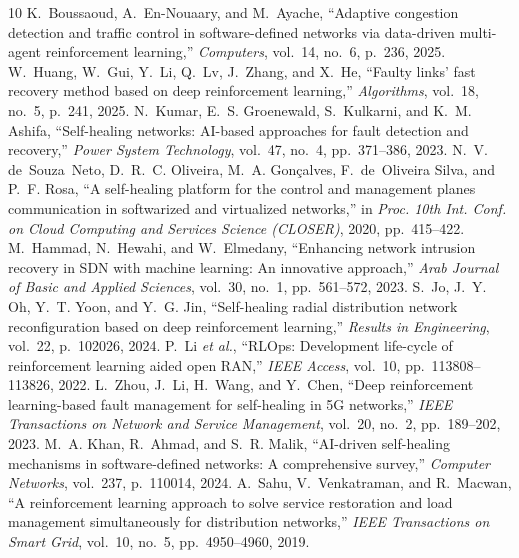 \documentclass[12pt,a4paper]{report}
\begin{document}
\begin{thebibliography}{10}
 K.~Boussaoud, A.~En-Nouaary, and M.~Ayache, ``Adaptive congestion
detection and traffic control in software-defined networks via data-driven multi-agent
reinforcement learning,'' \emph{Computers}, vol.~14, no.~6, p.~236, 2025.
 W.~Huang, W.~Gui, Y.~Li, Q.~Lv, J.~Zhang, and X.~He, ``Faulty links' fast
recovery method based on deep reinforcement learning,'' \emph{Algorithms}, vol.~18, no.~5,
p.~241, 2025.
 N.~Kumar, E.~S. Groenewald, S.~Kulkarni, and K.~M. Ashifa, ``Self-healing
networks: AI-based approaches for fault detection and recovery,'' \emph{Power System
Technology}, vol.~47, no.~4, pp.~371--386, 2023.
 N.~V. de~Souza~Neto, D.~R.~C. Oliveira, M.~A. Gon\c{c}alves, F.~de~Oliveira
Silva, and P.~F. Rosa, ``A self-healing platform for the control and management planes
communication in softwarized and virtualized networks,'' in \emph{Proc. 10th Int. Conf. on
Cloud Computing and Services Science (CLOSER)}, 2020, pp.~415--422.
 M.~Hammad, N.~Hewahi, and W.~Elmedany, ``Enhancing network intrusion recovery
in SDN with machine learning: An innovative approach,'' \emph{Arab Journal of Basic and
Applied Sciences}, vol.~30, no.~1, pp.~561--572, 2023.
 S.~Jo, J.~Y. Oh, Y.~T. Yoon, and Y.~G. Jin, ``Self-healing radial distribution
network reconfiguration based on deep reinforcement learning,'' \emph{Results in
Engineering}, vol.~22, p.~102026, 2024.
 P.~Li \emph{et al.}, ``RLOps: Development life-cycle of reinforcement learning
aided open RAN,'' \emph{IEEE Access}, vol.~10, pp.~113808--113826, 2022.
 L.~Zhou, J.~Li, H.~Wang, and Y.~Chen, ``Deep reinforcement learning-based
fault management for self-healing in 5G networks,'' \emph{IEEE Transactions on Network and
Service Management}, vol.~20, no.~2, pp.~189--202, 2023.
 M.~A. Khan, R.~Ahmad, and S.~R. Malik, ``AI-driven self-healing mechanisms in
software-defined networks: A comprehensive survey,'' \emph{Computer Networks}, vol.~237,
p.~110014, 2024.
 A.~Sahu, V.~Venkatraman, and R.~Macwan, ``A reinforcement learning approach to
solve service restoration and load management simultaneously for distribution networks,''
\emph{IEEE Transactions on Smart Grid}, vol.~10, no.~5, pp.~4950--4960, 2019.
\end{thebibliography}
\end{document}

